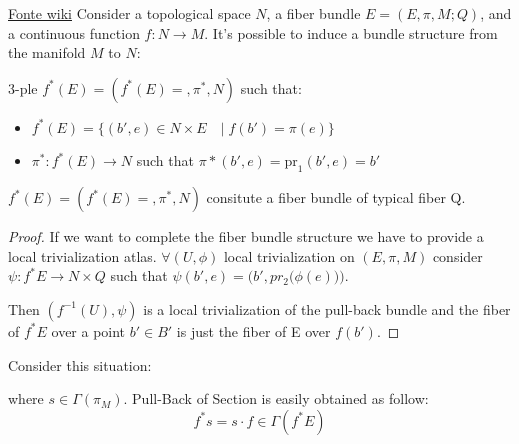 \documentclass[a4paper,12pt]{scrartcl}    %
\begin{document}
\danger \href{https://en.wikipedia.org/wiki/Pullback_bundle}{Fonte wiki}
Consider a topological space $N$, a fiber bundle $E=(E,\pi,M;Q)$, and a continuous function $f: N \rightarrow M$. It's possible to induce\cite{Husemoller} a bundle structure from the manifold $M$ to $N$:
\begin{definition}
	3-ple $f^* (E) = (f^* (E) =, \pi^*,N)$ such that:
	\begin{itemize}
		\item $f^* (E) =  \big\{ (b',e) \in N \times E \quad \big\vert \; f(b') = \pi(e) \big\} $
		\item $\pi^*:f^* (E) \rightarrow N $ such that $ \pi* (b',e) = \textrm{pr}_1 (b',e)= b' $
	\end{itemize}
\end{definition}

\begin{proposition}
$f^* (E) = (f^* (E) =, \pi^*,N)$ consitute a fiber bundle of typical fiber Q.
\end{proposition}\begin{proof}
If we want to complete the fiber bundle structure we have to provide a local trivialization atlas.
$\forall ( U, \phi)$ local trivialization on $(E, \pi, M)$  consider $\psi: f^* E \rightarrow N \times Q$ such that $\psi( b',e) = \bigg( b', pr_2 \big( \phi(e)\big)\bigg)$.

Then $(f^{-1}(U),\psi)$ is a local trivialization of the pull-back bundle and the fiber of $f^*E$ over a point $b′\in B'$  is just the fiber of E over $f(b′)$.
\end{proof}

\begin{observation}
Consider this situation:

where $s \in \Gamma(\pi_M)$.
Pull-Back of Section is easily obtained as follow:
\begin{displaymath}
f^* s = s \cdot f \in \Gamma(f^* E)
\end{displaymath}

\end{observation}
\end{document}
